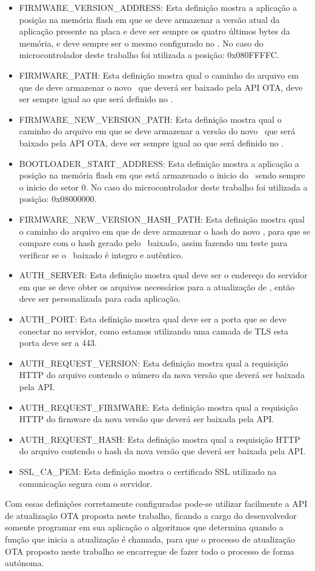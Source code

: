 \begin{itemize}
    \item FIRMWARE\_VERSION\_ADDRESS: Esta definição mostra a aplicação a posição na memória flash em que se deve armazenar a versão atual da aplicação presente na placa e deve ser sempre os quatro últimos bytes da memória, e deve sempre ser o mesmo configurado no \bootloader. No caso do microcontrolador deste trabalho foi utilizada a posição: 0x080FFFFC.
    \item FIRMWARE\_PATH: Esta definição mostra qual o caminho do arquivo em que de deve armazenar o novo \firmware\ que deverá ser baixado pela API OTA, deve ser sempre igual ao que será definido no \bootloader.
    \item FIRMWARE\_NEW\_VERSION\_PATH: Esta definição mostra qual o caminho do arquivo em que se deve armazenar a versão do novo \firmware\ que será baixado pela API OTA, deve ser sempre igual ao que será definido no \bootloader.
    \item BOOTLOADER\_START\_ADDRESS: Esta definição mostra a aplicação a posição na memória flash em que está armazenado o inicio do \bootloader\ sendo sempre o inicio do setor 0. No caso do microcontrolador deste trabalho foi utilizada a posição: 0x08000000.
    \item FIRMWARE\_NEW\_VERSION\_HASH\_PATH: Esta definição mostra qual o caminho do arquivo em que de deve armazenar o hash do novo \firmware, para que se compare com o hash gerado pelo \firmware\ baixado, assim fazendo um teste para verificar se o \firmware\ baixado é integro e autêntico.
    \item AUTH\_SERVER: Esta definição mostra qual deve ser o endereço do servidor em que se deve obter os arquivos necessários para a atualização de \firmware, então deve ser personalizada para cada aplicação.
    \item AUTH\_PORT: Esta definição mostra qual deve ser a porta que se deve conectar no servidor, como estamos utilizando uma camada de TLS esta porta deve ser a 443.
    \item AUTH\_REQUEST\_VERSION: Esta definição mostra qual a requisição HTTP do arquivo contendo o número da nova versão que deverá ser baixada pela API.
    \item AUTH\_REQUEST\_FIRMWARE: Esta definição mostra qual a requisição HTTP do firmware da nova versão que deverá ser baixada pela API.
    \item AUTH\_REQUEST\_HASH: Esta definição mostra qual a requisição HTTP do arquivo contendo o hash da nova versão que deverá ser baixada pela API.
    \item SSL\_CA\_PEM: Esta definição mostra o certificado SSL utilizado na comunicação segura com o servidor.
\end{itemize}

Com essas definições corretamente configuradas pode-se utilizar facilmente a API de atualização OTA proposta neste trabalho, ficando a cargo do desenvolvedor somente programar em sua aplicação o algoritmos que determina quando a função que inicia a atualização é chamada, para que o processo de atualização OTA proposto neste trabalho se encarregue de fazer todo o processo de forma autónoma. 

